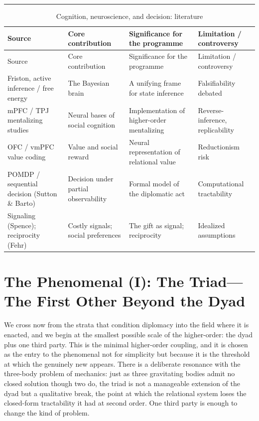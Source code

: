 \documentclass[11pt,a4paper]{article}
\newcommand{\goldrule}{\noindent\textcolor{gold}{\rule{\linewidth}{0.6pt}}\par\vspace{0.4em}}
\begin{document}
\goldrule
\footnotesize
\begin{longtable}{Y Y Y Y}
\caption{Cognition, neuroscience, and decision: literature}\label{p07:tab:neuro}\\
\toprule
{}
Source & Core contribution & Significance for the programme & Limitation / controversy \\
\midrule
\endfirsthead
\toprule
{}
Source & Core contribution & Significance for the programme & Limitation / controversy \\
\midrule
\endhead
Friston, active inference / free energy & The Bayesian brain & A unifying frame for state inference & Falsifiability debated \\
mPFC / TPJ mentalizing studies & Neural bases of social cognition & Implementation of higher-order mentalizing & Reverse-inference, replicability \\
OFC / vmPFC value coding & Value and social reward & Neural representation of relational value & Reductionism risk \\
POMDP / sequential decision (Sutton \& Barto) & Decision under partial observability & Formal model of the diplomatic act & Computational tractability \\
Signaling (Spence); reciprocity (Fehr) & Costly signals; social preferences & The gift as signal; reciprocity & Idealized assumptions \\
\bottomrule
\end{longtable}

\section{The Phenomenal (I): The Triad---The First Other Beyond the Dyad}\label{p07:sec:triad}

We cross now from the strata that condition diplomacy into the field where it is enacted, and we begin at the smallest possible scale of the higher-order: the dyad plus one third party. This is the minimal higher-order coupling, and it is chosen as the entry to the phenomenal not for simplicity but because it is the threshold at which the genuinely new appears. There is a deliberate resonance with the three-body problem of mechanics: just as three gravitating bodies admit no closed solution though two do, the triad is not a manageable extension of the dyad but a qualitative break, the point at which the relational system loses the closed-form tractability it had at second order. One third party is enough to change the kind of problem.
\end{document}
